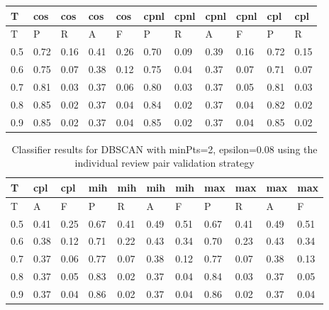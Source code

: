 \begin{center}
\begin{table}[!h]
\centering
\begin{tabular}{|l|l|l|l|l|l|l|l|l|l|l|}
  \hline
T & cos & cos & cos & cos & cpnl & cpnl & cpnl & cpnl & cpl & cpl \\ 
  \hline
T & P & R & A & F & P & R & A & F & P & R \\ 
   \hline
0.5 & 0.72 & 0.16 & 0.41 & 0.26 & 0.70 & 0.09 & 0.39 & 0.16 & 0.72 & 0.15 \\ 
  0.6 & 0.75 & 0.07 & 0.38 & 0.12 & 0.75 & 0.04 & 0.37 & 0.07 & 0.71 & 0.07 \\ 
  0.7 & 0.81 & 0.03 & 0.37 & 0.06 & 0.80 & 0.03 & 0.37 & 0.05 & 0.81 & 0.03 \\ 
  0.8 & 0.85 & 0.02 & 0.37 & 0.04 & 0.84 & 0.02 & 0.37 & 0.04 & 0.82 & 0.02 \\ 
  0.9 & 0.85 & 0.02 & 0.37 & 0.04 & 0.85 & 0.02 & 0.37 & 0.04 & 0.85 & 0.02 \\ 
   \hline
\end{tabular}
\end{table}
\begin{table}[!h]
\centering
\begin{tabular}{|l|l|l|l|l|l|l|l|l|l|l|}
  \hline
T & cpl & cpl & mih & mih & mih & mih & max & max & max & max \\ 
  \hline
T & A & F & P & R & A & F & P & R & A & F \\ 
   \hline
0.5 & 0.41 & 0.25 & 0.67 & 0.41 & 0.49 & 0.51 & 0.67 & 0.41 & 0.49 & 0.51 \\ 
  0.6 & 0.38 & 0.12 & 0.71 & 0.22 & 0.43 & 0.34 & 0.70 & 0.23 & 0.43 & 0.34 \\ 
  0.7 & 0.37 & 0.06 & 0.77 & 0.07 & 0.38 & 0.12 & 0.77 & 0.07 & 0.38 & 0.13 \\ 
  0.8 & 0.37 & 0.05 & 0.83 & 0.02 & 0.37 & 0.04 & 0.84 & 0.03 & 0.37 & 0.05 \\ 
  0.9 & 0.37 & 0.04 & 0.86 & 0.02 & 0.37 & 0.04 & 0.86 & 0.02 & 0.37 & 0.04 \\ 
   \hline
\end{tabular}
\caption{Classifier results for DBSCAN with minPts=2, epsilon=0.08 using the individual review pair validation strategy} 
\label{}
\end{table}\end{center}
